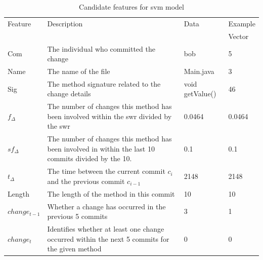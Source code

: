 \begin{table}
\begin{center}
    \begin{tabularx}{\linewidth}{|l|X|l|l|}
        \hline
        Feature & Description & Data & Example \\
         & & & Vector \\
        \hline
        Com & The individual who committed the change & bob & 5 \\ \hline
        Name & The name of the file & Main.java & 3 \\ \hline
        Sig & The method signature related to the change details & void getValue() & 46\\ \hline
        
        $f_{\Delta}$ & The number of changes this method has been involved within the \gls{swr} divided by the \gls{swr} & 0.0464 & 0.0464 \\ \hline
        $sf_{\Delta}$ & The number of changes this method has been involved in within the last 10 commits divided by the 10. & 0.1 & 0.1 \\ \hline
        $t_\Delta$ & The time between the current commit $c_i$ and the previous commit $c_{i-1}$ & 2148 & 2148 \\ \hline

        Length & The length of the method in this commit & 10 & 10 \\ \hline
        $change_{t-1}$ & Whether a change has occurred in the previous 5 commits & 3 & 1 \\
        \hline
        $change_{t}$ & Identifies whether at least one change occurred within the next 5 commits for the given method & 0 & 0\\
        \hline
    \end{tabularx}
\end{center}
    \caption{Candidate features for \gls{svm} model}
    \label{tab:candidate_features}
\end{table}


